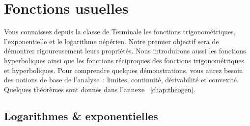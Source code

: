 \chapter{Fonctions usuelles}
\label{chap:fonctionsusuelles}
\minitoc
\minilof
\minilot
Vous connaissez depuis la classe de Terminale les fonctions trigonométriques, 
l’exponentielle et le logarithme népérien. Notre premier objectif sera de 
démontrer rigoureusement leurs propriétés. Nous introduirons aussi les fonctions 
hyperboliques ainsi que les fonctions réciproques des fonctions trigonométriques 
et hyperboliques. Pour comprendre quelques démonstrations, vous aurez besoin des 
notions de base de l’analyse~: limites, continuité, dérivabilité et convexité.  
Quelques théorèmes sont donnés dans l'annexe~
\ref{chap:theogen}.
\section{Logarithmes \& exponentielles}
\label{sec:chap1-logetexp}
